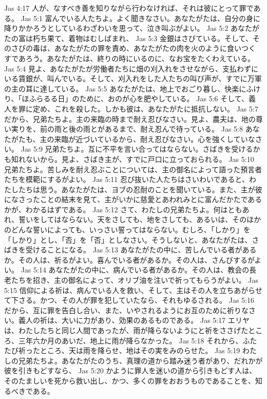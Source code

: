 Jas 4:17  人が、なすべき善を知りながら行わなければ、それは彼にとって罪である。
Jas 5:1  富んでいる人たちよ。よく聞きなさい。あなたがたは、自分の身に降りかかろうとしているわざわいを思って、泣き叫ぶがよい。
Jas 5:2  あなたがたの富は朽ち果て、着物はむしばまれ、
Jas 5:3  金銀はさびている。そして、そのさびの毒は、あなたがたの罪を責め、あなたがたの肉を火のように食いつくすであろう。あなたがたは、終りの時にいるのに、なお宝をたくわえている。
Jas 5:4  見よ、あなたがたが労働者たちに畑の刈入れをさせながら、支払わずにいる賃銀が、叫んでいる。そして、刈入れをした人たちの叫び声が、すでに万軍の主の耳に達している。
Jas 5:5  あなたがたは、地上でおごり暮し、快楽にふけり、「ほふらるる日」のために、おのが心を肥やしている。
Jas 5:6  そして、義人を罪に定め、これを殺した。しかも彼は、あなたがたに抵抗しない。
Jas 5:7  だから、兄弟たちよ。主の来臨の時まで耐え忍びなさい。見よ、農夫は、地の尊い実りを、前の雨と後の雨とがあるまで、耐え忍んで待っている。
Jas 5:8  あなたがたも、主の来臨が近づいているから、耐え忍びなさい。心を強くしていなさい。
Jas 5:9  兄弟たちよ。互に不平を言い合ってはならない。さばきを受けるかも知れないから。見よ、さばき主が、すでに戸口に立っておられる。
Jas 5:10  兄弟たちよ。苦しみを耐え忍ぶことについては、主の御名によって語った預言者たちを模範にするがよい。
Jas 5:11  忍び抜いた人たちはさいわいであると、わたしたちは思う。あなたがたは、ヨブの忍耐のことを聞いている。また、主が彼になさったことの結末を見て、主がいかに慈愛とあわれみとに富んだかたであるかが、わかるはずである。
Jas 5:12  さて、わたしの兄弟たちよ。何はともあれ、誓いをしてはならない。天をさしても、地をさしても、あるいは、そのほかのどんな誓いによっても、いっさい誓ってはならない。むしろ、「しかり」を「しかり」とし、「否」を「否」としなさい。そうしないと、あなたがたは、さばきを受けることになる。
Jas 5:13  あなたがたの中に、苦しんでいる者があるか。その人は、祈るがよい。喜んでいる者があるか。その人は、さんびするがよい。
Jas 5:14  あなたがたの中に、病んでいる者があるか。その人は、教会の長老たちを招き、主の御名によって、オリブ油を注いで祈ってもらうがよい。
Jas 5:15  信仰による祈は、病んでいる人を救い、そして、主はその人を立ちあがらせて下さる。かつ、その人が罪を犯していたなら、それもゆるされる。
Jas 5:16  だから、互に罪を告白し合い、また、いやされるようにお互のために祈りなさい。義人の祈は、大いに力があり、効果のあるものである。
Jas 5:17  エリヤは、わたしたちと同じ人間であったが、雨が降らないようにと祈をささげたところ、三年六か月のあいだ、地上に雨が降らなかった。
Jas 5:18  それから、ふたたび祈ったところ、天は雨を降らせ、地はその実をみのらせた。
Jas 5:19  わたしの兄弟たちよ。あなたがたのうち、真理の道から踏み迷う者があり、だれかが彼を引きもどすなら、
Jas 5:20  かように罪人を迷いの道から引きもどす人は、そのたましいを死から救い出し、かつ、多くの罪をおおうものであることを、知るべきである。


